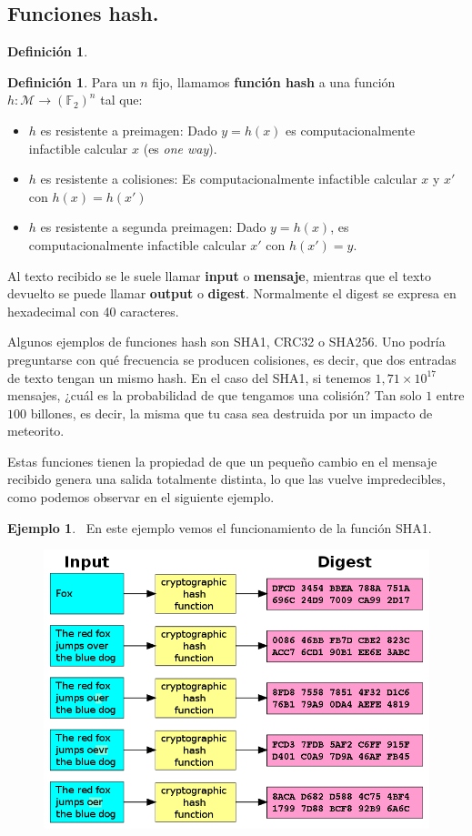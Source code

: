 \documentclass[twoside]{article}
\theoremstyle{definition}
\newtheorem{defi}[teorema]{Definición}
\newtheorem{ej}[teorema]{Ejemplo}
\begin{document}
\subsection{Funciones hash.}
\begin{defi}
\begin{defi}
Para un $n$ fijo, llamamos \textbf{función hash} a una función $h : \mathcal{M} \to (\mathbb{F}_2)^n$ tal que:
\begin{itemize}
	\item $h$ es resistente a preimagen: Dado $y=h(x)$ es computacionalmente infactible calcular $x$ (es \emph{one way}).
	\item $h$ es resistente a colisiones: Es computacionalmente infactible calcular $x$ y $x'$ con $h(x) = h(x')$
	\item $h$ es resistente a segunda preimagen: Dado $y=h(x)$, es computacionalmente infactible calcular $x'$ con $h(x')=y$.  
\end{itemize}
\end{defi}
Al texto recibido se le suele llamar \textbf{input} o \textbf{mensaje}, mientras que el texto devuelto se puede llamar \textbf{output} o \textbf{digest}. Normalmente el digest se expresa en hexadecimal con 40 caracteres. 
\end{defi}
Algunos ejemplos de funciones hash son SHA1, CRC32 o SHA256. Uno podría preguntarse con qué frecuencia se producen colisiones, es decir, que dos entradas de texto tengan un mismo hash. En el caso del SHA1, si tenemos $1,71\times 10^{17}$ mensajes, ¿cuál es la probabilidad de que tengamos una colisión? Tan solo $1$ entre $100$ billones, es decir, la misma que tu casa sea destruida por un impacto de meteorito.

Estas funciones tienen la propiedad de que un pequeño cambio en el mensaje recibido genera una salida totalmente distinta, lo que las vuelve impredecibles, como podemos observar en el siguiente ejemplo.
	
\begin{ej}\
En este ejemplo vemos el funcionamiento de la función SHA1. 
\begin{figure}[h!]
\includegraphics[scale=0.4]{hashexample}
\end{figure}
\end{ej}
\end{document}
